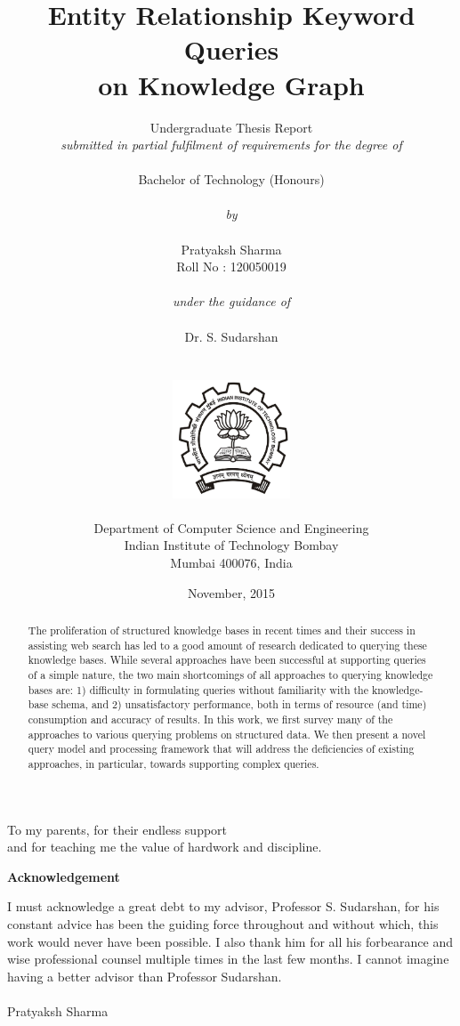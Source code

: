 \documentclass[a4paper, twoside, 12pt]{report}
\title{\textbf{Entity Relationship Keyword Queries \\ on Knowledge Graph}}
\author{Undergraduate Thesis Report \\ \emph{submitted in partial fulfilment of requirements for the degree of}\\
        \\
        {Bachelor of Technology (Honours)}\\
        \\
        \emph{by}\\
        \\
		{Pratyaksh Sharma}\\
        {Roll No : 120050019}\\
        \\
        \emph{under the guidance of}\\
        \\
		{Dr. S. Sudarshan}\\
        \\\\
        \includegraphics[height=3.5cm]{iitb_logo.jpg}\\
        \\
		{Department of Computer Science and Engineering}\\
        {Indian Institute of Technology Bombay}\\
        {Mumbai 400076, India}\\
}
\date{November, 2015}
\makeatletter
\newcommand\blankpage{%
    \null
    \thispagestyle{empty}%
    \addtocounter{page}{-1}%
    \newpage}
\newenvironment{dedication}
  {\clearpage           %
   \thispagestyle{empty}%
   \vspace*{\stretch{1}}%
   \itshape             %
   \center          %
  }
  {\par %
   \vspace{\stretch{3}} %
   \clearpage           %
}
\newcommand\frontmatter{%
    \cleardoublepage
  \pagenumbering{roman}}
\makeatother
\begin{document}
\frontmatter
\linespread{1}

\maketitle


\begin{dedication}
To my parents, for their endless support \\
and for teaching me the value of hardwork and discipline.
\end{dedication}




\renewcommand{\abstractname}{Abstract}
\begin{abstract}
  The proliferation of structured knowledge bases in recent times and their success in assisting web search has led to a good amount of research dedicated to querying these knowledge bases. While several approaches have been successful at supporting queries of a simple nature, the two main shortcomings of all approaches to querying knowledge bases are: 1) difficulty in formulating queries without familiarity with the knowledge-base schema, and 2) unsatisfactory performance, both in terms of resource (and time) consumption and accuracy of results. In this work, we first survey many of the approaches to various querying problems on structured data. We then present a novel query model and processing framework that will address the deficiencies of existing approaches, in particular, towards supporting complex queries.

\end{abstract}



\clearpage
\thispagestyle{empty}
\vspace*{\fill}
\vspace{-5cm}
\begin{center}
\bf{Acknowledgement}
\end{center}
I must acknowledge a great debt to my advisor, Professor S. Sudarshan, for his constant advice has been the guiding force throughout and without which, this work would never have been possible. I also thank him for all his forbearance and wise professional counsel multiple times in the last few months. I cannot imagine having a better advisor than Professor Sudarshan.
\\ \\
Pratyaksh Sharma
\vspace*{\fill}
\end{document}

